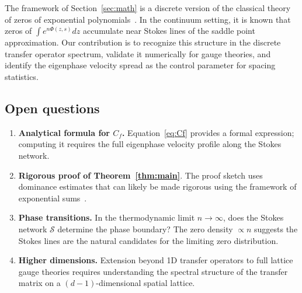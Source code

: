 \documentclass[12pt]{article}
\theoremstyle{definition}
\theoremstyle{remark}
\begin{document}
The framework of Section~\ref{sec:math} is a discrete version of the
classical theory of zeros of exponential polynomials~\cite{BerryHowls1991,
DingleBook}.  In the continuum setting, it is known that zeros of
$\int e^{n\Phi(z,s)}dz$ accumulate near Stokes lines of the saddle
point approximation.  Our contribution is to recognize this structure
in the discrete transfer operator spectrum, validate it
numerically for gauge theories, and identify the eigenphase velocity
spread as the control parameter for spacing statistics.

\subsection{Open questions}

\begin{enumerate}
\item \textbf{Analytical formula for $C_f$.}  Equation~\eqref{eq:Cf}
  provides a formal expression; computing it requires the full
  eigenphase velocity profile along the Stokes network.

\item \textbf{Rigorous proof of Theorem~\ref{thm:main}}.  The proof
  sketch uses dominance estimates that can likely be made rigorous
  using the framework of exponential sums~\cite{Olver1997}.

\item \textbf{Phase transitions.}  In the thermodynamic limit
  $n \to \infty$, does the Stokes network $\mathcal{S}$ determine
  the phase boundary?  The zero density $\propto n$ suggests the
  Stokes lines are the natural candidates for the limiting zero
  distribution.

\item \textbf{Higher dimensions.}  Extension beyond 1D transfer
  operators to full lattice gauge theories requires understanding
  the spectral structure of the transfer matrix on a $(d{-}1)$-dimensional
  spatial lattice.
\end{enumerate}
\end{document}
